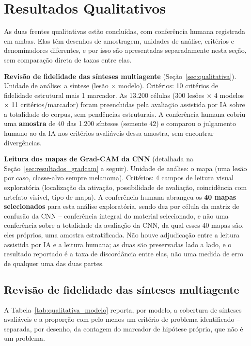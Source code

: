 \section{Resultados Qualitativos}
\label{sec:resultados_qualitativos}

As duas frentes qualitativas estão concluídas, com conferência humana registrada em ambas. Elas têm desenhos de amostragem, unidades de análise, critérios e denominadores diferentes, e por isso são apresentadas separadamente nesta seção, sem comparação direta de taxas entre elas.

\textbf{Revisão de fidelidade das sínteses multiagente} (Seção~\ref{sec:qualitativa}). Unidade de análise: a síntese (lesão $\times$ modelo). Critérios: 10 critérios de fidelidade estrutural mais 1 marcador. As 13.200 células (300 lesões $\times$ 4 modelos $\times$ 11 critérios/marcador) foram preenchidas pela avaliação assistida por IA sobre a totalidade do corpus, sem pendências estruturais. A conferência humana cobriu uma \textbf{amostra} de 40 das 1.200 sínteses (semente 42) e comparou o julgamento humano ao da IA nos critérios avaliáveis dessa amostra, sem encontrar divergências.

\textbf{Leitura dos mapas de Grad-CAM da CNN} (detalhada na Seção~\ref{sec:resultados_gradcam} a seguir). Unidade de análise: o mapa (uma lesão por caso, classe-alvo sempre melanoma). Critérios: 4 campos de leitura visual exploratória (localização da ativação, possibilidade de avaliação, coincidência com artefato visível, tipo de mapa). A conferência humana abrangeu os \textbf{40 mapas selecionados} para esta análise exploratória, sendo dez por célula da matriz de confusão da CNN -- conferência integral do material selecionado, e não uma conferência sobre a totalidade da avaliação da CNN, da qual esses 40 mapas são, eles próprios, uma amostra estratificada. Não houve adjudicação entre a leitura assistida por IA e a leitura humana; as duas são preservadas lado a lado, e o resultado reportado é a taxa de discordância entre elas, não uma medida de erro de qualquer uma das duas partes.

\subsection{Revisão de fidelidade das sínteses multiagente}

A Tabela~\ref{tab:qualitativa_modelo} reporta, por modelo, a cobertura de sínteses avaliáveis e a proporção com pelo menos um critério de problema identificado -- separada, por desenho, da contagem do marcador de hipótese própria, que não é um problema.


